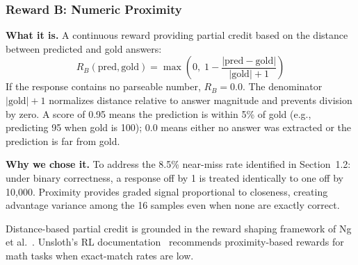 \subsubsection{Reward B: Numeric Proximity}
\nestindent

\textbf{What it is.}
A continuous reward providing partial credit based on the distance between predicted and gold answers:
\[
R_B(\text{pred}, \text{gold}) = \max\!\left(0,\; 1 - \frac{|\text{pred} - \text{gold}|}{|\text{gold}| + 1}\right)
\]
If the response contains no parseable number, $R_B = 0.0$.
The denominator $|\text{gold}| + 1$ normalizes distance relative to answer magnitude and prevents division by zero.
A score of 0.95 means the prediction is within 5\% of gold (e.g., predicting 95 when gold is 100); 0.0 means either no answer was extracted or the prediction is far from gold.

\textbf{Why we chose it.}
To address the 8.5\% near-miss rate identified in Section~1.2: under binary correctness, a response off by 1 is treated identically to one off by 10{,}000.
Proximity provides graded signal proportional to closeness, creating advantage variance among the 16 samples even when none are exactly correct.

Distance-based partial credit is grounded in the reward shaping framework of Ng et al.~\cite{ng1999reward}.
Unsloth's RL documentation~\cite{unsloth} recommends proximity-based rewards for math tasks when exact-match rates are low.
\nestunindent
